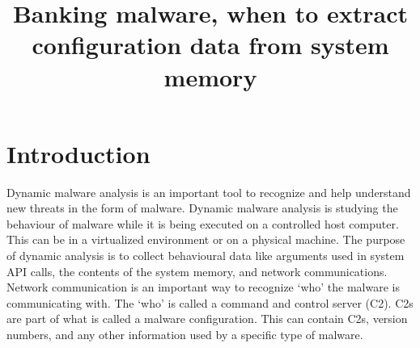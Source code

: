 \documentclass[conference]{IEEEtran}
\begin{document}
\title{Banking malware, when to extract configuration data from system memory}


\author{
\and
{}
}



\maketitle






%
\IEEEpeerreviewmaketitle



\section{Introduction}
Dynamic malware analysis is an important tool to recognize and help understand new threats in the form of malware. 
Dynamic malware analysis is studying the behaviour of malware while it is being executed on a controlled host computer. This can be in a virtualized environment or on a physical machine. The purpose of dynamic analysis is to collect behavioural data like arguments used in system API calls, the contents of the system memory, and network communications. Network communication is an important way to recognize ‘who’ the malware is communicating with. The ‘who’ is called a command and control server (C2). C2s are part of what is called a malware configuration. This can contain C2s, version numbers, and any other information used by a specific type of malware.\\
\end{document}
